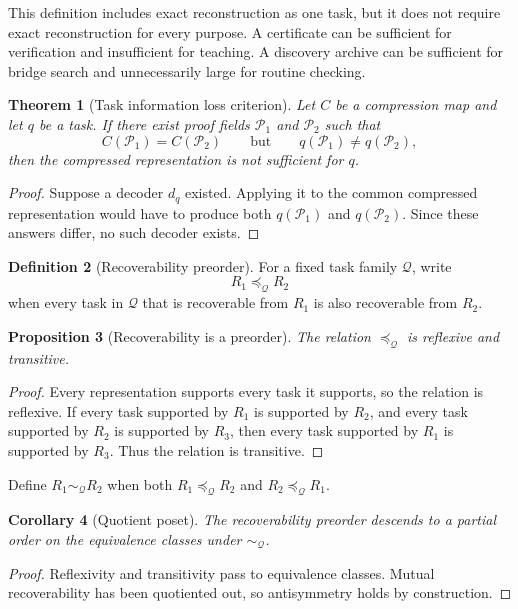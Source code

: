 \documentclass[11pt,oneside]{article}
\newtheorem{theorem}{Theorem}[section]
\newtheorem{proposition}[theorem]{Proposition}
\newtheorem{corollary}[theorem]{Corollary}
\theoremstyle{definition}
\newtheorem{definition}[theorem]{Definition}
\theoremstyle{remark}
\newcommand{\Pcal}{\mathcal P}
\newcommand{\Qcal}{\mathcal Q}
\begin{document}
This definition includes exact reconstruction as one task, but it does not require exact reconstruction for every purpose. A certificate can be sufficient for verification and insufficient for teaching. A discovery archive can be sufficient for bridge search and unnecessarily large for routine checking.

\begin{theorem}[Task information loss criterion]
Let $C$ be a compression map and let $q$ be a task. If there exist proof fields $\Pcal_1$ and $\Pcal_2$ such that
\[
C(\Pcal_1)=C(\Pcal_2)
\qquad\text{but}\qquad
q(\Pcal_1)\ne q(\Pcal_2),
\]
then the compressed representation is not sufficient for $q$.
\end{theorem}

\begin{proof}
Suppose a decoder $d_q$ existed. Applying it to the common compressed representation would have to produce both $q(\Pcal_1)$ and $q(\Pcal_2)$. Since these answers differ, no such decoder exists.
\end{proof}

\begin{definition}[Recoverability preorder]
For a fixed task family $\Qcal$, write
\[
R_1\preceq_{\Qcal} R_2
\]
when every task in $\Qcal$ that is recoverable from $R_1$ is also recoverable from $R_2$.
\end{definition}

\begin{proposition}[Recoverability is a preorder]
The relation $\preceq_{\Qcal}$ is reflexive and transitive.
\end{proposition}

\begin{proof}
Every representation supports every task it supports, so the relation is reflexive. If every task supported by $R_1$ is supported by $R_2$, and every task supported by $R_2$ is supported by $R_3$, then every task supported by $R_1$ is supported by $R_3$. Thus the relation is transitive.
\end{proof}

Define $R_1\sim_{\Qcal}R_2$ when both $R_1\preceq_{\Qcal}R_2$ and $R_2\preceq_{\Qcal}R_1$.

\begin{corollary}[Quotient poset]
The recoverability preorder descends to a partial order on the equivalence classes under $\sim_{\Qcal}$.
\end{corollary}

\begin{proof}
Reflexivity and transitivity pass to equivalence classes. Mutual recoverability has been quotiented out, so antisymmetry holds by construction.
\end{proof}
\end{document}
